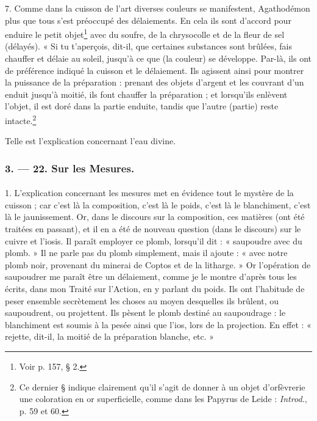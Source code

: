 \documentclass[a4paper, 11pt, oneside, polutonikogreek, french]{article}
\begin{document}
7. Comme dans la cuisson de l'art diverses couleurs se manifestent, Agathodémon plus que tous s'est préoccupé des délaiements. En cela ils sont d'accord pour enduire le petit objet\footnote{Voir p. 157, § 2.} avec du soufre, de la chrysocolle et de la fleur de sel (délayés). « Si tu t'aperçois, dit-il, que certaines substances sont brûlées, fais chauffer et délaie au soleil, jusqu'à ce que (la couleur) se développe. Par-là, ils ont de préférence indiqué la cuisson et le délaiement. Ils agissent ainsi pour montrer la puissance de la préparation : prenant des objets d'argent et les couvrant d'un enduit jusqu'à moitié, ils font chauffer la préparation ; et lorsqu'ils enlèvent l'objet, il est doré dans la partie enduite, tandis que l'autre (partie) reste intacte.\footnote{Ce dernier § indique clairement qu'il s'agit de donner à un objet d'orfèvrerie une coloration en or superficielle, comme dans les Papyrus de Leide : \emph{Introd.}, p. 59 et 60.}

Telle est l'explication concernant l'eau divine.

\bigskip
\centerline{\EightStarTaper}
\centerline{\EightStarTaper\EightStarTaper}
\bigskip

\subsubsection{3. --- 22. Sur les Mesures.}
\paragraph{}
1. L'explication concernant les mesures met en évidence tout le mystère de la cuisson ; car c'est là la composition, c'est là le poids, c'est là le blanchiment, c'est là le jaunissement. Or, dans le discours sur la composition, ces matières (ont été traitées en passant), et il en a été de nouveau question (dans le discours) sur le cuivre et l'iosis. Il paraît employer ce plomb, lorsqu'il dit : « saupoudre avec du plomb. » Il ne parle pas du plomb simplement, mais il ajoute : « avec notre plomb noir, provenant du minerai de Coptos et de la litharge. » Or l'opération de saupoudrer me paraît être un délaiement, comme je le montre d'après tous les écrits, dans mon Traité sur l'Action, en y parlant du poids. Ils ont l'habitude de peser ensemble secrètement les choses au moyen desquelles ils brûlent, ou saupoudrent, ou projettent. Ils pèsent le plomb destiné au saupoudrage : le blanchiment est soumis à la pesée ainsi que l'ios, lors de la projection. En effet : « rejette, dit-il, la moitié de la préparation blanche, etc. »
\end{document}
